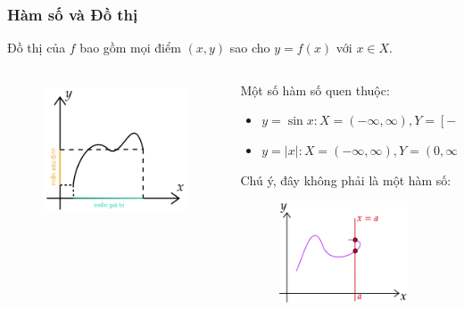\begin{frame}
\frametitle{Hàm số và Đồ thị}
   Đồ thị của \(f\) bao gồm mọi điểm \((x,y)\) sao cho \(y=f(x)\) với \(x\in X\).
  \begin{columns}
    \begin{column}{0.5\textwidth}
      \begin{figure}
        \centering
        \includegraphics[width=5cm, height= 4cm]{Slides/figure/hamso1 - Copy.png}
      \end{figure}
    \end{column}
    \begin{column}{0.5\textwidth}
      Một số hàm số quen thuộc:
      \begin{itemize}
        \item \(y=\sin x : X= (-\infty, \infty), Y=[-1,1]\)
        \item \(y=\lvert x\rvert : X= (-\infty, \infty), Y=(0,\infty)\)
      \end{itemize}
      Chú ý, đây không phải là một hàm số:
    \begin{figure}
        \centering
        \includegraphics[width=4cm, height= 3cm]{Slides/figure/khongphaihamso - Copy.png}
      \end{figure}
    \end{column}
  \end{columns}
\end{frame}
    